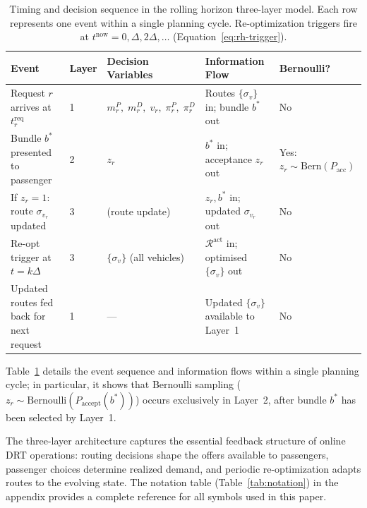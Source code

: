 \begin{table}[h]
\centering
\caption{Timing and decision sequence in the rolling horizon three-layer model.
         Each row represents one event within a single planning cycle.
         Re-optimization triggers fire at $t^{\text{now}} = 0, \Delta, 2\Delta, \ldots$
         (Equation~\ref{eq:rh-trigger}).}
\label{tab:timing-diagram}
\footnotesize
\begin{tabular}{p{3.0cm}lp{3.5cm}p{3.5cm}l}
\toprule
\textbf{Event} & \textbf{Layer} & \textbf{Decision Variables} & \textbf{Information Flow} & \textbf{Bernoulli?} \\
\midrule
Request $r$ arrives at $t_r^{\text{req}}$ &
  1 &
  $m_r^P,\; m_r^D,\; v_r,\; \pi_r^P,\; \pi_r^D$ &
  Routes $\{\sigma_v\}$ in; bundle $b^*$ out &
  No \\[4pt]
Bundle $b^*$ presented to passenger &
  2 &
  $z_r$ &
  $b^*$ in; acceptance $z_r$ out &
  Yes: $z_r \!\sim\! \mathrm{Bern}(P_{\text{acc}})$ \\[4pt]
If $z_r=1$: route $\sigma_{v_r}$ updated &
  3 &
  (route update) &
  $z_r, b^*$ in; updated $\sigma_{v_r}$ out &
  No \\[4pt]
Re-opt trigger at $t = k\Delta$ &
  3 &
  $\{\sigma_v\}$ (all vehicles) &
  $\mathcal{R}^{\text{act}}$ in; optimised $\{\sigma_v\}$ out &
  No \\[4pt]
Updated routes fed back for next request &
  1 &
  --- &
  Updated $\{\sigma_v\}$ available to Layer~1 &
  No \\
\bottomrule
\end{tabular}
\end{table}

Table~\ref{tab:timing-diagram} details the event sequence and information
flows within a single planning cycle; in particular, it shows that Bernoulli
sampling ($z_r \sim \mathrm{Bernoulli}(P_{\text{accept}}(b^*))$) occurs
exclusively in Layer~2, after bundle $b^*$ has been selected by Layer~1.

The three-layer architecture captures the essential feedback structure of online DRT
operations: routing decisions shape the offers available to passengers, passenger choices
determine realized demand, and periodic re-optimization adapts routes to the evolving
state. The notation table (Table~\ref{tab:notation}) in the appendix provides a complete
reference for all symbols used in this paper.
